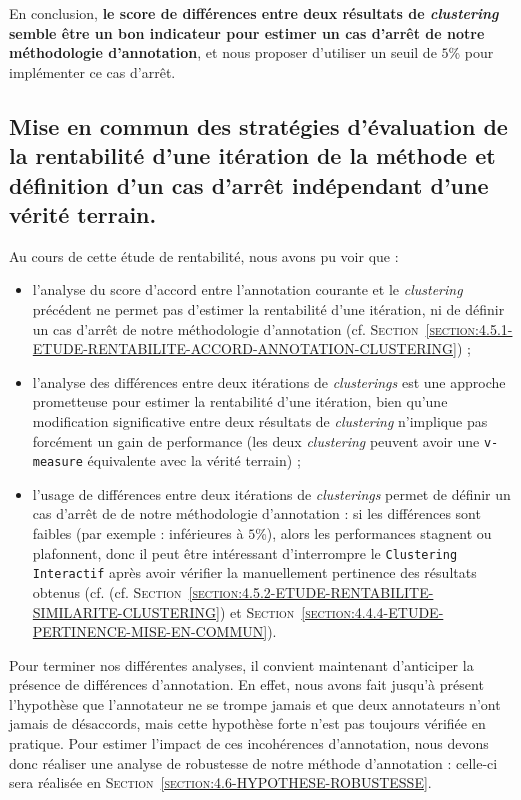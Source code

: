 			En conclusion, \textbf{le score de différences entre deux résultats de \textit{clustering} semble être un bon indicateur pour estimer un cas d'arrêt de notre méthodologie d'annotation}, et nous proposer d'utiliser un seuil de $5$\% pour implémenter ce cas d'arrêt.
			
	\subsection{Mise en commun des stratégies d'évaluation de la rentabilité d'une itération de la méthode et définition d'un cas d'arrêt indépendant d'une vérité terrain.}
	\label{section:4.5.3-ETUDE-RENTABILITE-MISE-EN-COMMUN}
			
		\begin{leftBarSummary}
			Au cours de cette étude de rentabilité, nous avons pu voir que :
			\begin{itemize}
				\item[\itemko] l'analyse du score d'accord entre l'annotation courante et le \textit{clustering} précédent ne permet pas d'estimer la rentabilité d'une itération, ni de définir un cas d'arrêt de notre méthodologie d'annotation (cf. \textsc{Section~\ref{section:4.5.1-ETUDE-RENTABILITE-ACCORD-ANNOTATION-CLUSTERING}}) ;
				\item[\itemok] l'analyse des différences entre deux itérations de \textit{clusterings} est une approche prometteuse pour estimer la rentabilité d'une itération, bien qu'une modification significative entre deux résultats de \textit{clustering} n'implique pas forcément un gain de performance (les deux \textit{clustering} peuvent avoir une \texttt{v-measure} équivalente avec la vérité terrain) ;
				\item[\itemok] l'usage de différences entre deux itérations de \textit{clusterings} permet de définir un cas d'arrêt de de notre méthodologie d'annotation : si les différences sont faibles (par exemple : inférieures à $5$\%), alors les performances stagnent ou plafonnent, donc il peut être intéressant d'interrompre le \texttt{Clustering Interactif} après avoir vérifier la manuellement pertinence des résultats obtenus (cf. (cf. \textsc{Section~\ref{section:4.5.2-ETUDE-RENTABILITE-SIMILARITE-CLUSTERING}}) et \textsc{Section~\ref{section:4.4.4-ETUDE-PERTINENCE-MISE-EN-COMMUN}}).
			\end{itemize}
		\end{leftBarSummary}
		
		Pour terminer nos différentes analyses, il convient maintenant d'anticiper la présence de différences d'annotation.
		En effet, nous avons fait jusqu'à présent l'hypothèse que l'annotateur ne se trompe jamais et que deux annotateurs n'ont jamais de désaccords, mais cette hypothèse forte n'est pas toujours vérifiée en pratique.
		Pour estimer l'impact de ces incohérences d'annotation, nous devons donc réaliser une analyse de robustesse de notre méthode d'annotation : celle-ci sera réalisée en \textsc{Section~\ref{section:4.6-HYPOTHESE-ROBUSTESSE}}.